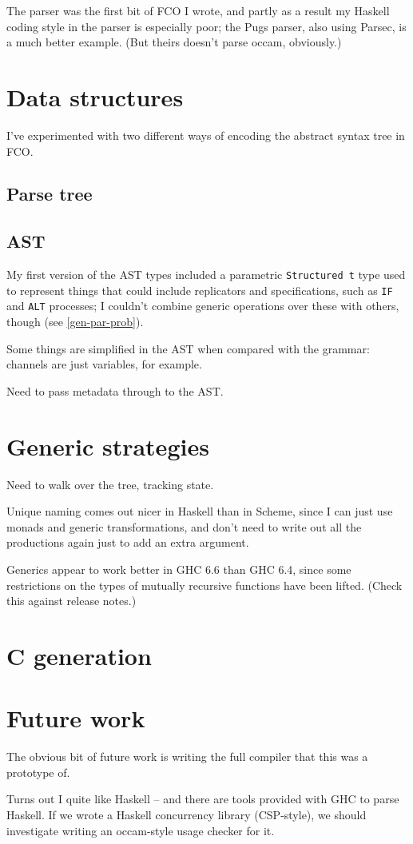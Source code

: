 \documentclass[a4paper,12pt]{article}
\def\occam{{\sffamily occam}\xspace}
\begin{document}
The parser was the first bit of FCO I wrote, and partly as a result my
Haskell coding style in the parser is especially poor; the Pugs parser,
also using Parsec, is a much better example. (But theirs doesn't parse
\occam, obviously.)

\section{Data structures}

I've experimented with two different ways of encoding the abstract
syntax tree in FCO.

\subsection{Parse tree}

\subsection{AST}

My first version of the AST types included a parametric
\verb|Structured t| type used to represent things that could include
replicators and specifications, such as \verb|IF| and \verb|ALT|
processes; I couldn't combine generic operations over these with others,
though (see \ref{gen-par-prob}).

Some things are simplified in the AST when compared with the grammar:
channels are just variables, for example.

Need to pass metadata through to the AST.

\section{Generic strategies}

Need to walk over the tree, tracking state.

Unique naming comes out nicer in Haskell than in Scheme, since I can
just use monads and generic transformations, and don't need to write out
all the productions again just to add an extra argument.

Generics appear to work better in GHC 6.6 than GHC 6.4, since some
restrictions on the types of mutually recursive functions have been
lifted. (Check this against release notes.)

\section{C generation}

\section{Future work}

The obvious bit of future work is writing the full compiler that this
was a prototype of.

Turns out I quite like Haskell -- and there are tools provided with GHC
to parse Haskell. If we wrote a Haskell concurrency library (CSP-style),
we should investigate writing an \occam-style usage checker for it.



\end{document}
